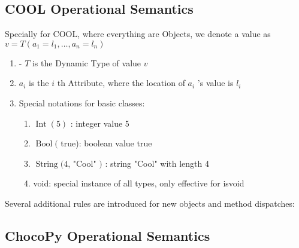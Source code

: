 \documentclass[a4paper]{exam}
\theoremstyle{definition}
\begin{document}
\subsection{COOL Operational Semantics}
Specially for COOL, where everything are Objects, we denote a value as $v=T\left(a_{1}=l_{1}, \ldots, a_{n}=l_{n}\right)$
\begin{enumerate}
    \item - $T$ is the Dynamic Type of value $v$
\item $a_{i}$ is the $i$ th Attribute, where the location of $a_{i}$ 's value is $l_{i}$
\item Special notations for basic classes:
\begin{enumerate}
    \item $\operatorname{Int}(5)$ : integer value 5
\item $\operatorname{Bool}($ true): boolean value true
\item $\operatorname{String}(4$, "Cool" $)$ : string "Cool" with length 4
\item void: special instance of all types, only effective for isvoid
\end{enumerate}
\end{enumerate}
Several additional rules are introduced for new objects and method dispatches:

\subsection{ChocoPy Operational Semantics}
\end{document}
